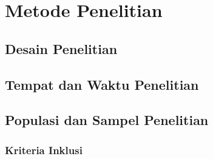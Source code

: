 \chapter{Metode Penelitian}


\section{Desain Penelitian}


\section{Tempat dan Waktu Penelitian}


\section{Populasi dan Sampel Penelitian}


\subsection{Kriteria Inklusi}


